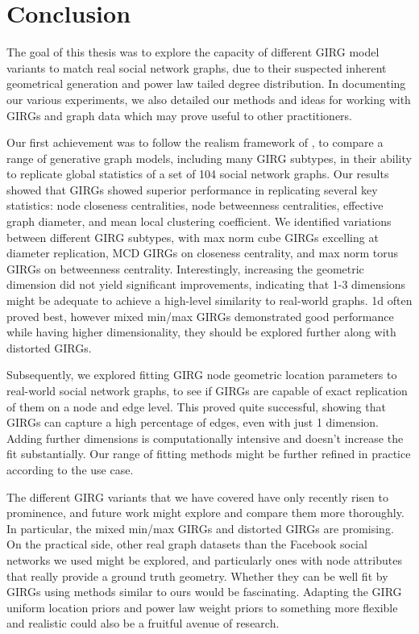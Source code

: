 \chapter{Conclusion}
The goal of this thesis was to explore the capacity of different GIRG model variants to match real social network graphs, due to their suspected inherent geometrical generation and power law tailed degree distribution. In documenting our various experiments, we also detailed our methods and ideas for working with GIRGs and graph data which may prove useful to other practitioners.

Our first achievement was to follow the realism framework of \cite{blasius2018towards}, to compare a range of generative graph models, including many GIRG subtypes, in their ability to replicate global statistics of a set of 104 social network graphs.
Our results showed that GIRGs showed superior performance in replicating several key statistics: node closeness centralities, node betweenness centralities, effective graph diameter, and mean local clustering coefficient. We identified variations between different GIRG subtypes, with max norm cube GIRGs excelling at diameter replication, MCD GIRGs on closeness centrality, and max norm torus GIRGs on betweenness centrality. 
Interestingly, increasing the geometric dimension did not yield significant improvements, indicating that 1-3 dimensions might be adequate to achieve a high-level similarity to real-world graphs. 1d often proved best, however mixed min/max GIRGs demonstrated good performance while having higher dimensionality, they should be explored further along with distorted GIRGs.

Subsequently, we explored fitting GIRG node geometric location parameters to real-world social network graphs, to see if GIRGs are capable of exact replication of them on a node and edge level. This proved quite successful, showing that GIRGs can capture a high percentage of edges, even with just 1 dimension. Adding further dimensions is computationally intensive and doesn't increase the fit substantially. Our range of fitting methods might be further refined in practice according to the use case. 

The different GIRG variants that we have covered have only recently risen to prominence, and future work might explore and compare them more thoroughly. In particular, the mixed min/max GIRGs and distorted GIRGs are promising. On the practical side, other real graph datasets than the Facebook social networks we used might be explored, and particularly ones with node attributes that really provide a ground truth geometry. Whether they can be well fit by GIRGs using methods similar to ours would be fascinating. Adapting the GIRG uniform location priors and power law weight priors to something more flexible and realistic could also be a fruitful avenue of research.


